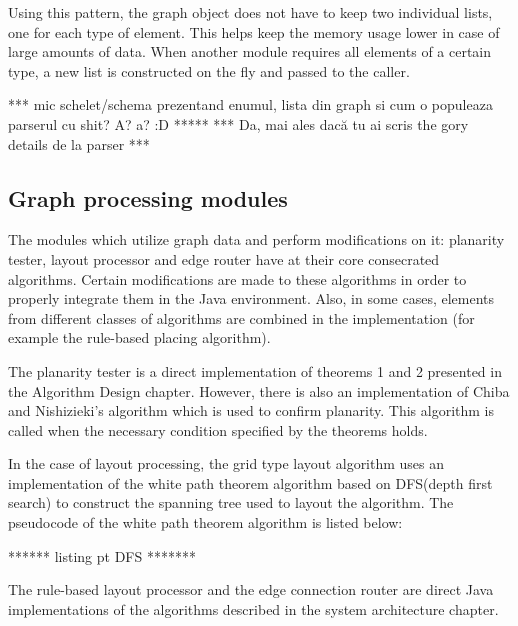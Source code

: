 Using this pattern, the graph object does not have to keep two individual lists, one for each type of element. This 
helps keep the memory usage lower in case of large amounts of data. When another module requires all elements of a 
certain type, a new list is constructed on the fly and passed to the caller.

*** mic schelet/schema prezentand enumul, lista din graph si cum o populeaza parserul cu shit? A? a? :D *****
*** Da, mai ales dacă tu ai scris the gory details de la parser *** 

\subsection{Graph processing modules}

The modules which utilize graph data and perform modifications on it: planarity tester, layout processor and edge router 
have at their core consecrated algorithms. Certain modifications are made to these algorithms in order to properly integrate 
them in the Java environment. Also, in some cases, elements from different classes of algorithms are combined in the 
implementation (for example the rule-based placing algorithm).

The planarity tester is a direct implementation of theorems 1 and 2 presented in the Algorithm Design chapter. However, there 
is also an implementation of Chiba and Nishizieki's algorithm which is used to confirm planarity. This algorithm is called 
when the necessary condition specified by the theorems holds.

In the case of layout processing, the grid type layout algorithm uses an implementation of the white path theorem algorithm 
based on DFS(depth first search) to construct the spanning tree used to layout the algorithm. The pseudocode of the white path 
theorem algorithm is listed below:

****** listing pt DFS *******

The rule-based layout processor and the edge connection router are direct Java implementations of the algorithms described 
in the system architecture chapter.

